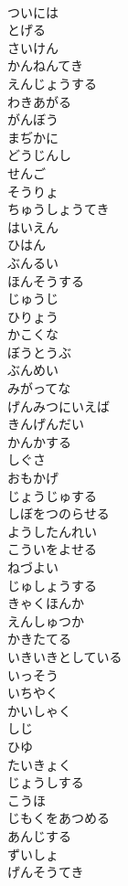 \documentclass[8pt]{extreport}
\begin{document}
\begin{CJK}{UTF8}{min}
\\	ついには
\\	とげる
\\	さいけん
\\	かんねんてき
\\	えんじょうする
\\	わきあがる
\\	がんぼう
\\	まぢかに
\\	どうじんし
\\	せんご
\\	そうりょ
\\	ちゅうしょうてき
\\	はいえん
\\	ひはん
\\	ぶんるい
\\	ほんそうする
\\	じゅうじ
\\	ひりょう
\\	かこくな
\\	ぼうとうぶ
\\	ぶんめい
\\	みがってな
\\	げんみつにいえば
\\	きんげんだい
\\	かんかする
\\	しぐさ
\\	おもかげ
\\	じょうじゅする
\\	しぼをつのらせる
\\	ようしたんれい
\\	こういをよせる
\\	ねづよい
\\	じゅしょうする
\\	きゃくほんか
\\	えんしゅつか
\\	かきたてる
\\	いきいきとしている
\\	いっそう
\\	いちやく
\\	かいしゃく
\\	しじ
\\	ひゆ
\\	たいきょく
\\	じょうしする
\\	こうほ
\\	じもくをあつめる
\\	あんじする
\\	ずいしょ
\\	げんそうてき

\end{CJK}
\end{document}
